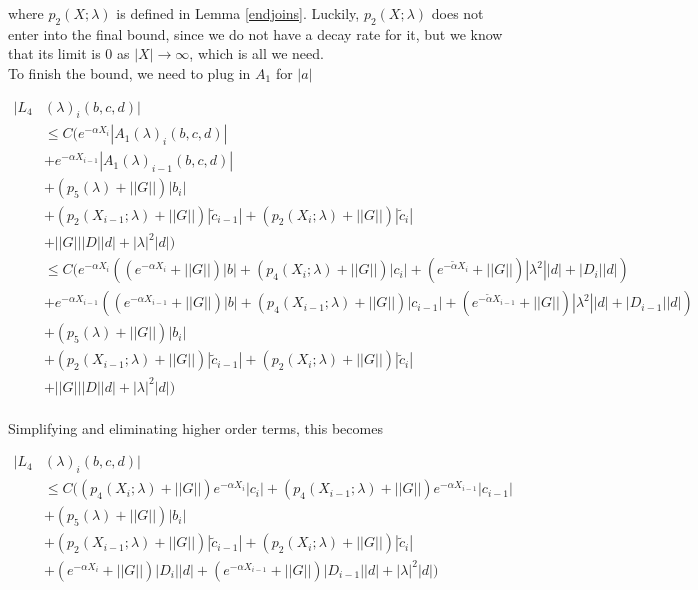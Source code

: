\documentclass[12pt]{article}
\begin{document}
where $p_2(X; \lambda)$ is defined in Lemma \ref{endjoins}. Luckily, $p_2(X; \lambda)$ does not enter into the final bound, since we do not have a decay rate for it, but we know that its limit is 0 as $|X| \rightarrow \infty$, which is all we need.\\

To finish the bound, we need to plug in $A_1$ for $|a|$

\begin{align*}
|L_4&(\lambda)_i(b, c, d)|\\ 
&\leq C \Big( e^{-\alpha X_i} |A_1(\lambda)_i(b, c, d)| \\
&+  e^{-\alpha X_{i-1}} |A_1(\lambda)_{i-1}(b, c, d)| \\
&+ (p_5(\lambda) + ||G||) |b_i| \\
&+ (p_2(X_{i-1}; \lambda) + ||G||) |\tilde{c}_{i-1}| + (p_2(X_i; \lambda) + ||G||)|\tilde{c}_i| \\
&+ ||G|| |D||d| + |\lambda|^2|d|
\Big)\\
&\leq C \Big( e^{-\alpha X_i} ( (e^{-\alpha X_i} + ||G||) |b| + ( p_4(X_i; \lambda) + ||G|| )|c_i|
+ (e^{-\tilde{\alpha} X_i} + ||G||) |\lambda^2| |d| + |D_i||d| ) \\
&+  e^{-\alpha X_{i-1}} ( (e^{-\alpha X_{i-1}} + ||G||) |b| + ( p_4(X_{i-1}; \lambda) + ||G|| )|c_{i-1}|
+ (e^{-\tilde{\alpha} X_{i-1}} + ||G||) |\lambda^2| |d| + |D_{i-1}||d| ) \\
&+ (p_5(\lambda) + ||G||) |b_i| \\
&+ (p_2(X_{i-1}; \lambda) + ||G||) |\tilde{c}_{i-1}| + (p_2(X_i; \lambda) + ||G||)|\tilde{c}_i| \\
&+ ||G|| |D||d| + |\lambda|^2|d|
\Big)\\
\end{align*}

Simplifying and eliminating higher order terms, this becomes

\begin{align*}
|L_4&(\lambda)_i(b, c, d)|\\ 
&\leq C \Big( ( p_4(X_i; \lambda) + ||G|| ) e^{-\alpha X_i} |c_i|
+ ( p_4(X_{i-1}; \lambda) + ||G|| )e^{-\alpha X_{i-1}}|c_{i-1}| \\
&+ (p_5(\lambda) + ||G||) |b_i| \\
&+ (p_2(X_{i-1}; \lambda) + ||G||) |\tilde{c}_{i-1}| + (p_2(X_i; \lambda) + ||G||)|\tilde{c}_i| \\
&+ (e^{-\alpha X_i} + ||G||) |D_i||d| + (e^{-\alpha X_{i-1}} + ||G||) |D_{i-1}||d| +|\lambda|^2|d|
\Big)\\
\end{align*}
\end{document}
